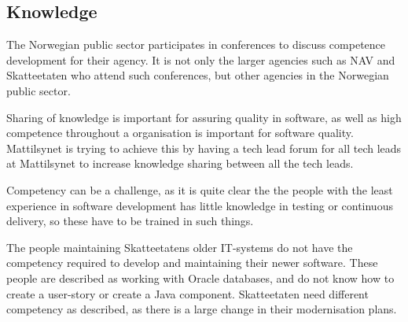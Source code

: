 \subsection{Knowledge}
The Norwegian public sector participates in conferences to discuss competence development for their agency. It is not only the larger agencies such as NAV and Skatteetaten who attend such conferences, but other agencies in the Norwegian public sector.

Sharing of knowledge is important for assuring quality in software, as well as high competence throughout a organisation is important for software quality. Mattilsynet is trying to achieve this by having a tech lead forum for all tech leads at Mattilsynet to increase knowledge sharing between all the tech leads.

Competency can be a challenge, as it is quite clear the the people with the least experience in software development has little knowledge in testing or continuous delivery, so these have to be trained in such things.

The people maintaining Skatteetatens older IT-systems do not have the competency required to develop and maintaining their newer software. These people are described as working with Oracle databases, and do not know how to create a user-story or create a Java component. Skatteetaten need different competency as described, as there is a large change in their modernisation plans.





